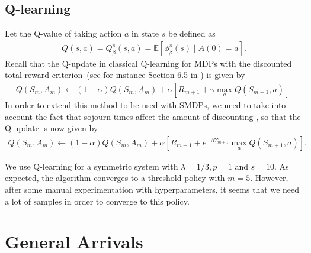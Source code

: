 \documentclass{article}
\theoremstyle{definition}
\theoremstyle{plain}
\begin{document}
\subsection{Q-learning}

Let the Q-value of taking action $a$ in state $s$ be defined as
\begin{align}
  Q(s, a) = Q_{\beta}^{\pi}(s, a) = \mathbb{E} \left[ \phi_{\beta}^{\pi}(s) \; \big| \;  A(0) = a \right] .
\end{align}
%
Recall that the Q-update in classical Q-learning for MDPs with the discounted
total reward criterion~(see for instance Section 6.5 in \cite{suttonReinforcementLearningIntroduction2018}) is given by
\begin{align}
  Q(S_{m}, A_{m}) \leftarrow (1 - \alpha) Q(S_{m}, A_{m}) + \alpha[ R_{m+1} + \gamma \max_{a} Q(S_{m+1}, a) ] .
\end{align}
%
In order to extend this method to be used with SMDPs, we need to take into
account the fact that sojourn times affect the amount of discounting
\citep{gosaviSimulationBasedOptimizationParametric2015}, so that the Q-update is
now given by
\begin{align}
  Q(S_{m}, A_{m}) \leftarrow (1 - \alpha) Q(S_{m}, A_{m}) + \alpha[ R_{m+1} + e^{- \beta \Upsilon_{m+1}} \max_{a} Q(S_{m+1}, a) ] .
\end{align}


We use Q-learning for a symmetric system with $\lambda = 1/3, p = 1$ and
$s = 10$. As expected, the algorithm converges to a threshold policy with $m=5$.
However, after some manual experimentation with hyperparameters, it seems that
we need a lot of samples in order to converge to this policy.


\section{General Arrivals}
\end{document}
